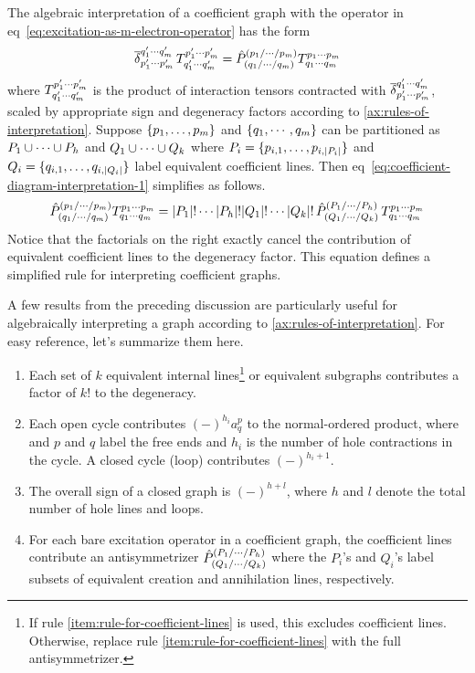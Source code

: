 \documentclass[11pt]{article}
\numberwithin{equation}{section}
\begin{document}
\begin{rmk}\label{rmk:algebraic-interpretation-of-coefficient-graph}
The algebraic interpretation of a coefficient graph with the operator in eq~\ref{eq:excitation-as-m-electron-operator} has the form
\begin{align}\label{eq:coefficient-diagram-interpretation-1}
  \overline{\delta }_{p_1'\cdots p_m'}^{q_1'\cdots q_m'}\,
  T^{p_1'\cdots p_m'}_{q_1'\cdots q_m'}
=
  \hat{P}^{(p_1/\cdots /p_m)}_{(q_1/\cdots /q_m)}
  T^{p_1\cdots p_m}_{q_1\cdots q_m}
\end{align}
where $T^{p_1'\cdots p_m'}_{q_1'\cdots q_m'}$ is the product of interaction tensors contracted with $\overline{\delta }_{p_1'\cdots p_m'}^{q_1'\cdots q_m'}$, scaled by appropriate sign and degeneracy factors according to \cref{ax:rules-of-interpretation}.
Suppose $\{p_1,\ldots,p_m\}$ and $\{q_1,\cdots,q_m\}$ can be partitioned as $P_1\cup\cdots\cup P_h$ and $Q_1\cup\cdots\cup Q_k$ where $P_i=\{p_{i,1},\ldots,p_{i,|P_i|}\}$ and $Q_i=\{q_{i,1},\ldots,q_{i,|Q_i|}\}$ label equivalent coefficient lines.
Then eq~\ref{eq:coefficient-diagram-interpretation-1} simplifies as follows.
\begin{align}
  \hat{P}^{(p_1/\cdots /p_m)}_{(q_1/\cdots /q_m)}
  T^{p_1\cdots p_m}_{q_1\cdots q_m}
=
  |P_1|!\cdots|P_h|!|Q_1|!\cdots|Q_k|!\,
  \hat{P}^{(P_1/\cdots /P_h)}_{(Q_1/\cdots /Q_k)}\,
  T^{p_1\cdots p_m}_{q_1\cdots q_m}
\end{align}
Notice that the factorials on the right exactly cancel the contribution of equivalent coefficient lines to the degeneracy factor.
This equation defines a simplified rule for interpreting coefficient graphs.
\end{rmk}


\begin{rmk}\label{rmk:useful-rules}
A few results from the preceding discussion are particularly useful for algebraically interpreting a graph according to \cref{ax:rules-of-interpretation}.
For easy reference, let's summarize them here.
\begin{enumerate}
\item
  Each set of $k$ equivalent internal lines\footnote{If rule \ref{item:rule-for-coefficient-lines} is used, this excludes coefficient lines.  Otherwise, replace rule \ref{item:rule-for-coefficient-lines} with the full antisymmetrizer.} or equivalent subgraphs contributes a factor of $k!$ to the degeneracy.
\item
  Each open cycle contributes $(-)^{h_i}a^p_q$ to the normal-ordered product, where and $p$ and $q$ label the free ends and $h_i$ is the number of hole contractions in the cycle.
  A closed cycle (loop) contributes $(-)^{h_i+1}$.
\item
  The overall sign of a closed graph is $(-)^{h+l}$, where $h$ and $l$ denote the total number of hole lines and loops.
\item\label{item:rule-for-coefficient-lines}
  For each bare excitation operator in a coefficient graph, the coefficient lines contribute an antisymmetrizer
  $\hat{P}^{(P_1/\cdots /P_h)}_{(Q_1/\cdots /Q_k)}$
  where the $P_i$'s and $Q_i$'s label subsets of equivalent creation and annihilation lines, respectively.
\end{enumerate}
\end{rmk}
\end{document}
